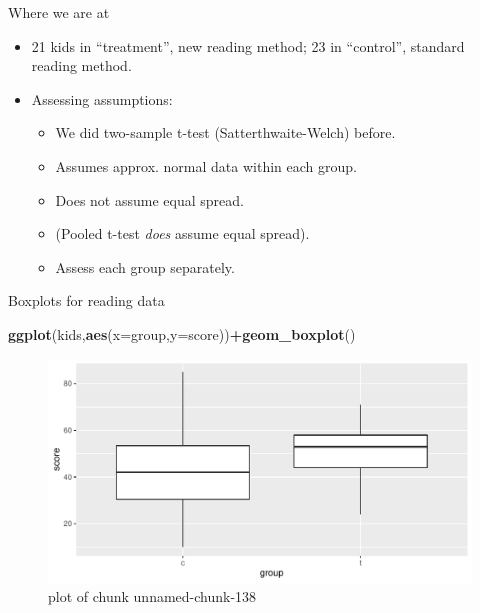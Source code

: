 \documentclass[
  ignorenonframetext,
]{beamer}
\newenvironment{Shaded}{\begin{snugshade}}{\end{snugshade}}
\newcommand{\DataTypeTok}[1]{\textcolor[rgb]{0.13,0.29,0.53}{#1}}
\newcommand{\KeywordTok}[1]{\textcolor[rgb]{0.13,0.29,0.53}{\textbf{#1}}}
\newcommand{\NormalTok}[1]{#1}
\newcommand{\OperatorTok}[1]{\textcolor[rgb]{0.81,0.36,0.00}{\textbf{#1}}}
\providecommand{\tightlist}{%
  \setlength{\itemsep}{0pt}\setlength{\parskip}{0pt}}
\begin{document}
\begin{frame}{Where we are at}
\protect\hypertarget{where-we-are-at}{}

\begin{itemize}
\item
  21 kids in ``treatment'', new reading method; 23 in ``control'',
  standard reading method.
\item
  Assessing assumptions:

  \begin{itemize}
  \tightlist
  \item
    We did two-sample t-test (Satterthwaite-Welch) before.
  \item
    Assumes approx. normal data within each group.
  \item
    Does not assume equal spread.
  \item
    (Pooled t-test \emph{does} assume equal spread).
  \item
    Assess each group separately.
  \end{itemize}
\end{itemize}

\end{frame}

\begin{frame}[fragile]{Boxplots for reading data}
\protect\hypertarget{boxplots-for-reading-data}{}

\begin{Shaded}
\begin{Highlighting}[]
\KeywordTok{ggplot}\NormalTok{(kids,}\KeywordTok{aes}\NormalTok{(}\DataTypeTok{x=}\NormalTok{group,}\DataTypeTok{y=}\NormalTok{score))}\OperatorTok{+}\KeywordTok{geom_boxplot}\NormalTok{()}
\end{Highlighting}
\end{Shaded}

\begin{figure}
\centering
\includegraphics{figure/unnamed-chunk-138-1.pdf}
\caption{plot of chunk unnamed-chunk-138}
\end{figure}

\end{frame}
\end{document}

